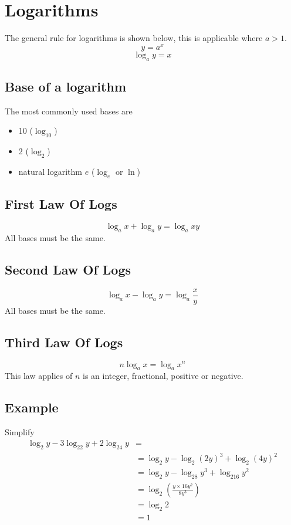 \section*{Logarithms}
The general rule for logarithms is shown below, this is applicable where $a>1$.
\[y=a^x\]
\[\log_{a}y = x\]
\subsection*{Base of a logarithm}
The most commonly used bases are
\begin{itemize}
    \item 10 ($\log_{10}$)
    \item 2 ($\log_2$)
    \item natural logarithm $e$ ($\log_e$ or $\ln$)
\end{itemize}


\subsection*{First Law Of Logs}
\[\log_ax + \log_ay = \log_axy\]
All bases must be the same.

\subsection*{Second Law Of Logs}
\[\log_ax - \log_ay = \log_a\frac{x}{y}\]
All bases must be the same.

\subsection*{Third Law Of Logs}
\[n\log_ax=\log_ax^n\]
This law applies of $n$ is an integer, fractional, positive or negative.


\subsection*{Example}
\begin{example}{Simplify}
    \begin{align*}
        \log_2 y -3\log_22y+2\log_24y &=\\
        &= \log_2y-\log_2(2y)^3 +\log_2(4y)^2\\
        &= \log_2y - \log_28y^3 + \log_216y^2\\
        &= \log_2 \left(\frac{y\times 16y^2}{8y^3} \right)\\
        &= \log_2 2\\
        &=1
    \end{align*}
\end{example}